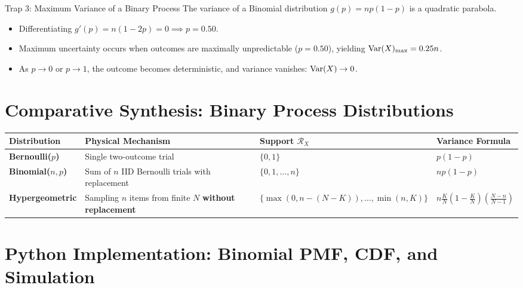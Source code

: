 \begin{trapbox}{Trap 3: Maximum Variance of a Binary Process}
The variance of a Binomial distribution $g(p) = np(1-p)$ is a quadratic parabola.
\begin{itemize}
    \item Differentiating $g'(p) = n(1 - 2p) = 0 \implies p = 0.50$.
    \item Maximum uncertainty occurs when outcomes are maximally unpredictable ($p = 0.50$), yielding $\operatorname{Var}(X)_{\max} = 0.25n$.
    \item As $p \to 0$ or $p \to 1$, the outcome becomes deterministic, and variance vanishes: $\operatorname{Var}(X) \to 0$.
\end{itemize}
\end{trapbox}

\section{Comparative Synthesis: Binary Process Distributions}

\begin{center}
\renewcommand{\arraystretch}{1.3}
\begin{tabular}{p{3.2cm}p{3.8cm}p{3.8cm}p{3.5cm}}
\toprule
\textbf{Distribution} & \textbf{Physical Mechanism} & \textbf{Support $\mathcal{R}_X$} & \textbf{Variance Formula} \\
\midrule
\textbf{Bernoulli($p$)} & Single two-outcome trial & $\{0, 1\}$ & $p(1 - p)$ \\
\textbf{Binomial($n, p$)} & Sum of $n$ IID Bernoulli trials with replacement & $\{0, 1, \dots, n\}$ & $np(1 - p)$ \\
\textbf{Hypergeometric} & Sampling $n$ items from finite $N$ \textbf{without replacement} & $\{\max(0, n - (N-K)), \dots, \min(n, K)\}$ & $n \frac{K}{N}\left(1 - \frac{K}{N}\right)\left(\frac{N-n}{N-1}\right)$ \\
\bottomrule
\end{tabular}
\end{center}

\section{Python Implementation: Binomial PMF, CDF, and Simulation}

